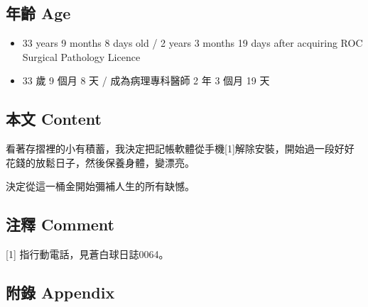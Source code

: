 \documentclass[
]{article}
\providecommand{\tightlist}{%
  \setlength{\itemsep}{0pt}\setlength{\parskip}{0pt}}
\begin{document}
\hypertarget{ux5e74ux9f61-age-30}{%
\subsection{年齡 Age}\label{ux5e74ux9f61-age-30}}

\begin{itemize}
\tightlist
\item
  33 years 9 months 8 days old / 2 years 3 months 19 days after
  acquiring ROC Surgical Pathology Licence
\item
  33 歲 9 個月 8 天 / 成為病理專科醫師 2 年 3 個月 19 天
\end{itemize}

\hypertarget{ux672cux6587-content-30}{%
\subsection{本文 Content}\label{ux672cux6587-content-30}}

看著存摺裡的小有積蓄，我決定把記帳軟體從手機{[}1{]}解除安裝，開始過一段好好花錢的放鬆日子，然後保養身體，變漂亮。

決定從這一桶金開始彌補人生的所有缺憾。

\hypertarget{ux6ce8ux91cb-comment-30}{%
\subsection{注釋 Comment}\label{ux6ce8ux91cb-comment-30}}

{[}1{]} 指行動電話，見蒼白球日誌0064。

\hypertarget{ux9644ux9304-appendix-30}{%
\subsection{附錄 Appendix}\label{ux9644ux9304-appendix-30}}
\end{document}
